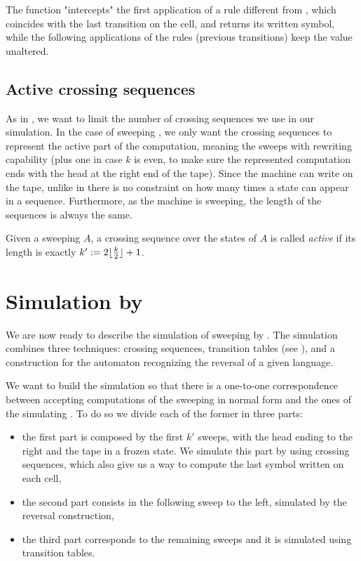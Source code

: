 The function "intercepts" the first application of a rule different from , which coincides with the last transition on the cell, and returns its written symbol, while the following applications of the rules (previous transitions) keep the value unaltered.


\subsection{Active crossing sequences}
As in \TDFAs, we want to limit the number of crossing sequences we use in our simulation.
In the case of sweeping \kDLAs, we only want the crossing sequences to represent the active part of the computation, meaning the sweeps with rewriting capability (plus one in case $k$ is even, to make sure the represented computation ends with the head at the right end of the tape).
Since the machine can write on the tape, unlike in \TDFAs there is no constraint on how many times a state can appear in a sequence. Furthermore, as the machine is sweeping, the length of the sequences is always the same.
\begin{defn}
	Given a sweeping \kLA $A$, a crossing sequence over the states of $A$ is called \emph{active} if its length is exactly $k':=2\lfloor \frac{k}{2} \rfloor+1$.
\end{defn}



\section{Simulation by \ONFA}\label{sec:swkdla-to-NFA}
We are now ready to describe the simulation of sweeping \kDLAs by \ONFAs.
The simulation combines three techniques: crossing sequences, transition tables (see ), and a construction for the automaton recognizing the reversal of a given language.

We want to build the simulation so that there is a one-to-one correspondence between accepting computations of the sweeping \kDLA in normal form and the ones of the simulating \ONFA.
To do so we divide each of the former in three parts:
\begin{itemize}
	\item the first part is composed by the first $k'$ sweeps, with the head ending to the right and the tape in a frozen state. We simulate this part by using crossing sequences, which also give us a way to compute the last symbol written on each cell,
	\item the second part consists in the following sweep to the left, simulated by the reversal construction,
	\item the third part corresponds to the remaining sweeps and it is simulated using transition tables.
\end{itemize}

